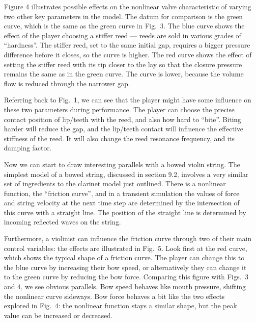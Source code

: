   Figure 4 illustrates possible effects on the nonlinear valve characteristic 
  of varying two other key parameters in the model. The datum for comparison is 
  the green curve, which is the same as the green curve in Fig.\ 3. The blue 
  curve shows the effect of the player choosing a stiffer reed — reeds are sold 
  in various grades of “hardness”. The stiffer reed, set to the same initial 
  gap, requires a bigger pressure difference before it closes, so the curve is 
  higher. The red curve shows the effect of setting the stiffer reed with its 
  tip closer to the lay so that the closure pressure remains the same as in the 
  green curve. The curve is lower, because the volume flow is reduced through 
  the narrower gap. 

  Referring back to Fig.\ 1, we can see that the player might have some 
  influence on these two parameters during performance. The player can choose 
  the precise contact position of lip/teeth with the reed, and also how hard to 
  “bite”. Biting harder will reduce the gap, and the lip/teeth contact will 
  influence the effective stiffness of the reed. It will also change the reed 
  resonance frequency, and its damping factor. 


  Now we can start to draw interesting parallels with a bowed violin string. 
  The simplest model of a bowed string, discussed in section 9.2, involves a 
  very similar set of ingredients to the clarinet model just outlined. There is 
  a nonlinear function, the “friction curve”, and in a transient simulation the 
  values of force and string velocity at the next time step are determined by 
  the intersection of this curve with a straight line. The position of the 
  straight line is determined by incoming reflected waves on the string. 

  Furthermore, a violinist can influence the friction curve through two of 
  their main control variables: the effects are illustrated in Fig.\ 5. Look 
  first at the red curve, which shows the typical shape of a friction curve. 
  The player can change this to the blue curve by increasing their bow speed, 
  or alternatively they can change it to the green curve by reducing the bow 
  force. Comparing this figure with Figs.\ 3 and 4, we see obvious parallels. 
  Bow speed behaves like mouth pressure, shifting the nonlinear curve sideways. 
  Bow force behaves a bit like the two effects explored in Fig.\ 4: the 
  nonlinear function stays a similar shape, but the peak value can be increased 
  or decreased. 

